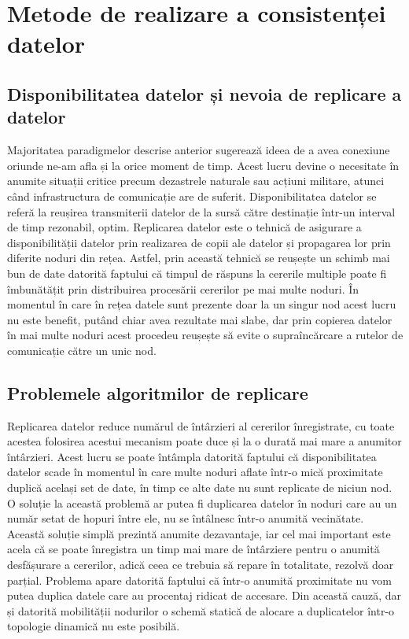 \documentclass[12pt,a4paper]{report}
\begin{document}
\section{Metode de realizare a consistenței datelor}
\subsection{Disponibilitatea datelor și nevoia de replicare a datelor}
Majoritatea paradigmelor descrise anterior sugerează ideea de a avea conexiune oriunde ne-am afla și la orice moment de timp. Acest lucru devine o necesitate în anumite situații critice precum dezastrele naturale sau acțiuni militare, atunci când infrastructura de comunicație are de suferit. Disponibilitatea datelor se referă la reușirea transmiterii datelor de la sursă către destinație într-un interval de timp rezonabil, optim. Replicarea datelor este o tehnică de asigurare a disponibilității datelor prin realizarea de copii ale datelor și propagarea lor prin diferite noduri din rețea. Astfel, prin această tehnică se reușește un schimb mai bun de date datorită faptului că timpul de răspuns la cererile multiple poate fi îmbunătățit prin distribuirea procesării cererilor pe mai multe noduri. În momentul în care în rețea datele sunt prezente doar la un singur nod acest lucru nu este benefit, putând chiar avea rezultate mai slabe, dar prin copierea datelor în mai multe noduri acest procedeu reușește să evite o supraîncărcare a rutelor de comunicație către un unic nod. 
\subsection{Problemele algoritmilor de replicare}
Replicarea datelor reduce numărul de întârzieri al cererilor înregistrate, cu toate acestea folosirea acestui mecanism poate duce și la o durată mai mare a anumitor întârzieri. Acest lucru se poate întâmpla datorită faptului că disponibilitatea datelor scade în momentul în care multe noduri aflate într-o mică proximitate duplică același set de date, în timp ce alte date nu sunt replicate de niciun nod. O soluție la această problemă ar putea fi duplicarea datelor în noduri care au un număr setat de hopuri între ele, nu se întâlnesc într-o anumită vecinătate. Această soluție simplă prezintă anumite dezavantaje, iar cel mai important este acela că se poate înregistra un timp mai mare de întârziere pentru o anumită desfășurare a cererilor, adică ceea ce trebuia să repare în totalitate, rezolvă doar parțial. Problema apare datorită faptului că într-o anumită proximitate nu vom putea duplica datele care au procentaj ridicat de accesare. Din această cauză, dar și datorită mobilității nodurilor o schemă statică de alocare a duplicatelor într-o topologie dinamică nu este posibilă.
\end{document}
